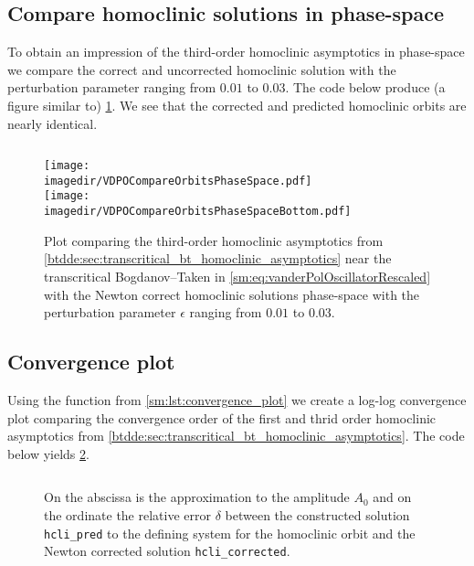 \subsection{Compare homoclinic solutions in phase-space}
To obtain an impression of the third-order homoclinic asymptotics in
phase-space we compare the correct and uncorrected homoclinic solution
with the perturbation parameter ranging from $0.01$ to $0.03$.
The code below produce (a figure similar to) \cref{sm:fig:VDPOCompareOrbitsPhaseSpace}.
We see that the corrected and predicted homoclinic orbits are nearly identical.
\inputminted[firstline=203, lastline=230]{MATLAB}{\pathToDDEBifToolDemos/vdpo_bt_transcritical/vanderPolOscillator.m}
%
\begin{figure}[ht]
    \centering
    \texttt{[image: \\imagedir/VDPOCompareOrbitsPhaseSpace.pdf]} \\
    \vspace*{20pt}
    \texttt{[image: \\imagedir/VDPOCompareOrbitsPhaseSpaceBottom.pdf]}
    \caption{Plot comparing the third-order homoclinic asymptotics from
        \cref{btdde:sec:transcritical_bt_homoclinic_asymptotics} near the
        transcritical Bogdanov--Taken in
        \cref{sm:eq:vanderPolOscillatorRescaled} with the Newton correct
        homoclinic solutions phase-space with the perturbation parameter
        $\epsilon$ ranging from $0.01$ to $0.03$.}
    \label{sm:fig:VDPOCompareOrbitsPhaseSpace}
\end{figure}

\subsection{Convergence plot}
\label{sm:sec:vdpo:convergence_plot}
Using the function from \cref{sm:lst:convergence_plot} we create a log-log
convergence plot comparing the convergence order of the first and thrid order
homoclinic asymptotics from \cref{btdde:sec:transcritical_bt_homoclinic_asymptotics}.
The code below yields \cref{sm:fig:VDPOConvergencePlot}.
\inputminted[firstline=232, lastline=243]{MATLAB}{\pathToDDEBifToolDemos/vdpo_bt_transcritical/vanderPolOscillator.m}
%
\begin{figure}[ht]
    \centering
        \caption{On the abscissa is the approximation to the amplitude $A_0$ and on
        the ordinate the relative error $\delta$ between the constructed solution
        \texttt{hcli_pred} to the defining system for the homoclinic orbit
        and the Newton corrected solution \texttt{hcli_corrected}.}
    \label{sm:fig:VDPOConvergencePlot}
\end{figure}

